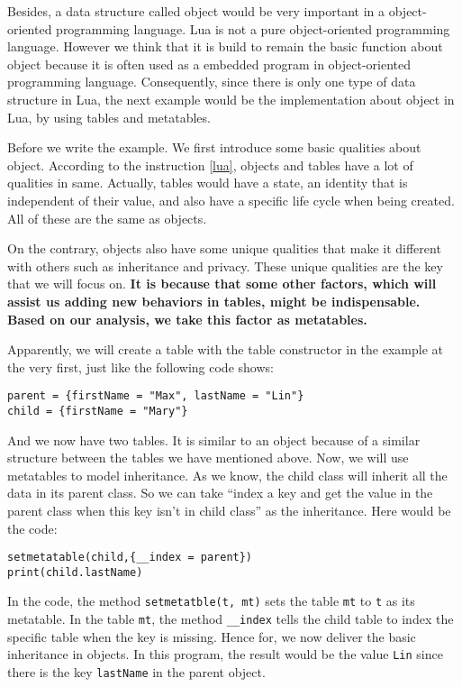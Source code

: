 \documentclass{article}
\begin{document}
Besides, a data structure called object would be very important in a object-oriented programming language. Lua is not a pure object-oriented programming language. However we think that it is build to remain the basic function about object because it is often used as a embedded program in object-oriented programming language. Consequently, since there is only one type of data structure in Lua, the next example would be the implementation about object in Lua, by using tables and metatables.

Before we write the example. We first introduce some basic qualities about object. According to the instruction \ref{lua}, objects and tables have a lot of qualities in same. Actually, tables would have a state, an identity that is independent of their value, and also have a specific life cycle when being created. All of these are the same as objects.

On the contrary, objects also have some unique qualities that make it different with others such as inheritance and privacy. These unique qualities are the key that we will focus on. {\bf It is because that some other factors, which will assist us adding new behaviors in tables, might be indispensable. Based on our analysis, we take this factor as metatables.}

Apparently, we will create a table with the table constructor in the example at the very first, just like the following code shows:
\begin{flushleft}
\tt parent = \{firstName = "Max", lastName = "Lin"\} \\
\tt child = \{firstName = "Mary"\} \\
\end{flushleft}
And we now have two tables. It is similar to an object because of a similar structure between the tables we have mentioned above. Now, we will use metatables to model inheritance. As we know, the child class will inherit all the data in its parent class. So we can take ``index a key and get the value in the parent class when this key isn't in child class'' as the inheritance. Here would be the code:
\begin{flushleft}
\tt setmetatable(child,\{\_\_index = parent\}) \\
\tt print(child.lastName)\\
\end{flushleft}

In the code, the method {\tt setmetatble(t, mt)} sets the table {\tt mt} to {\tt t} as its metatable. In the table {\tt mt}, the method {\tt \_\_index} tells the child table to index the specific table when the key is missing. Hence for, we now deliver the basic inheritance in objects. In this program, the result would be the value {\tt Lin} since there is the key {\tt lastName} in the parent object.
\end{document}
